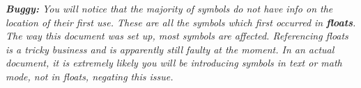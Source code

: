 \textit{\textbf{Buggy:} You will notice that the majority of symbols do not have info on the location of their first use.
These are all the symbols which first occurred in \textbf{floats}.
The way this document was set up, most symbols are affected.
Referencing floats is a tricky business and is apparently still faulty at the moment.
In an actual document, it is extremely likely you will be introducing symbols in text or math mode, not in floats, negating this issue.}
\printunsrtglossary[type = symbols, style = symbunitlong]
\printunsrtglossary[type = subsuper, style = mcolalttreegroup, nonumberlist]
\printunsrtglossary[type = abbreviations, style = myacr]
%
\listoffigures%
\listoftables%
%
\lstlistoflistings%
\cleardoubleoddpage%
%